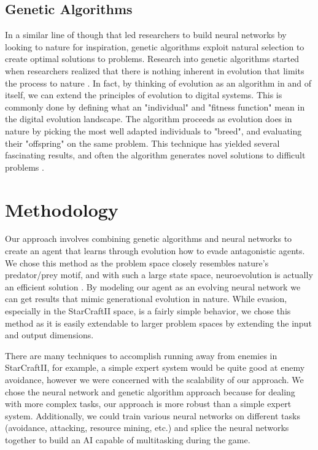 \documentclass{article}
\begin{document}
\begin{multicols}{2}
\subsection{Genetic Algorithms}
In a similar line of though that led researchers to build neural networks by
looking to nature for inspiration, genetic algorithms exploit natural selection
to create optimal solutions to problems. Research into genetic algorithms
started when researchers realized that there is nothing inherent in evolution
that limits the process to nature \cite{dejong}. In fact, by thinking of
evolution as an algorithm in and of itself, we can extend the principles of
evolution to
digital systems. This is commonly done by defining what an "individual" and
"fitness function" mean in the digital evolution landscape. The algorithm
proceeds as evolution does in nature by picking the most well adapted
individuals to "breed", and evaluating their "offspring" on the same problem.
This technique has yielded several fascinating results, and often the
algorithm generates novel solutions to difficult problems \cite{lehman}.

\section{Methodology}
Our approach involves combining genetic algorithms and neural networks to
create an agent that learns through evolution how to evade antagonistic
agents. We chose this method as the problem space closely resembles nature's
predator/prey motif, and with such a large state space, neuroevolution is
actually an efficient solution \cite{NEAT}. By modeling our agent as an
evolving neural network we can
get results that mimic generational evolution in nature. While evasion,
especially in the StarCraftII space, is a fairly simple behavior, we chose this
method as it is easily extendable to larger problem spaces by extending the
input and output dimensions.

There are many techniques to accomplish running away from enemies in
StarCraftII, for example, a simple expert system would be quite good at enemy
avoidance, however we were concerned with the scalability of our approach. We
chose the neural network and genetic algorithm approach because for dealing
with more complex tasks, our approach is more robust than a simple expert
system. Additionally, we could train various neural networks on different
tasks (avoidance, attacking, resource mining, etc.) and splice the neural
networks together to build an AI capable of multitasking during the game.


\end{multicols}
\end{document}
